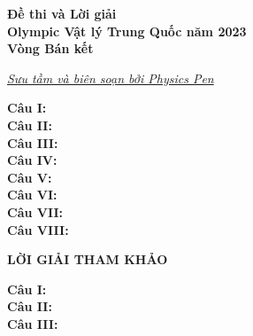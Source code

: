 \documentclass[12pt]{article}
\begin{document}
\thispagestyle{empty}

\begin{center}
  \LARGE\textbf{
    Đề thi và Lời giải\\
    Olympic Vật lý Trung Quốc năm 2023\\
    Vòng Bán kết}
\end{center}

\begin{center}
  \href{https://www.facebook.com/physicspen1111/}{\large{\textit{Sưu tầm và biên soạn bởi Physics Pen}}}
\end{center}

\vspace{1cm}

\noindent\textbf{Câu I:}\\


\noindent\textbf{Câu II:}\\


\noindent\textbf{Câu III:}\\


\noindent\textbf{Câu IV:}\\


\noindent\textbf{Câu V:}\\


\noindent\textbf{Câu VI:}\\


\noindent\textbf{Câu VII:}\\


\noindent\textbf{Câu VIII:}\\


\newpage

\begin{center}
  \noindent\Large\textbf{LỜI GIẢI THAM KHẢO}
\end{center}
\vspace{5mm}

\setcounter{equation}{0}
\noindent\textbf{Câu I:}\\


\newpage
\setcounter{equation}{0}
\noindent\textbf{Câu II:}\\


\newpage
\setcounter{equation}{0}
\noindent\textbf{Câu III:}\\

\end{document}
